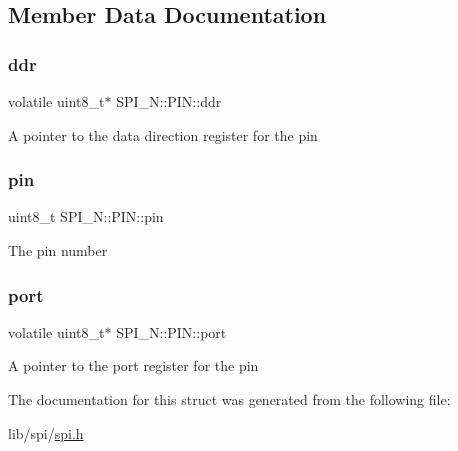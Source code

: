 \subsection{Member Data Documentation}
\hypertarget{struct_s_p_i___n_1_1_p_i_n_a6ccc89a50bb2562bacdd839edd2442c5}{}\label{struct_s_p_i___n_1_1_p_i_n_a6ccc89a50bb2562bacdd839edd2442c5} 
\subsubsection{\texorpdfstring{ddr}{ddr}}
{\footnotesize\ttfamily volatile uint8\+\_\+t$\ast$ S\+P\+I\+\_\+\+N\+::\+P\+I\+N\+::ddr}

A pointer to the data direction register for the pin \hypertarget{struct_s_p_i___n_1_1_p_i_n_abb2cb9d43e5af9fe7d59df75aca39b0b}{}\label{struct_s_p_i___n_1_1_p_i_n_abb2cb9d43e5af9fe7d59df75aca39b0b} 
\subsubsection{\texorpdfstring{pin}{pin}}
{\footnotesize\ttfamily uint8\+\_\+t S\+P\+I\+\_\+\+N\+::\+P\+I\+N\+::pin}

The pin number \hypertarget{struct_s_p_i___n_1_1_p_i_n_ae1d5f750e364d99dfa888bf2042fa6c2}{}\label{struct_s_p_i___n_1_1_p_i_n_ae1d5f750e364d99dfa888bf2042fa6c2} 
\subsubsection{\texorpdfstring{port}{port}}
{\footnotesize\ttfamily volatile uint8\+\_\+t$\ast$ S\+P\+I\+\_\+\+N\+::\+P\+I\+N\+::port}

A pointer to the port register for the pin 

The documentation for this struct was generated from the following file\+:\begin{DoxyCompactItemize}
\item 
lib/spi/\hyperlink{spi_8h}{spi.\+h}\end{DoxyCompactItemize}
